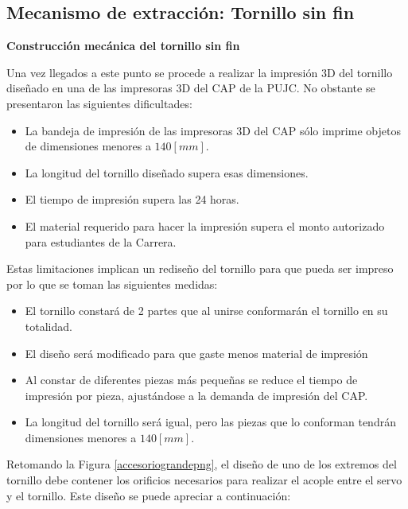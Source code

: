 \subsection{Mecanismo de extracción: Tornillo sin fin}
\item \textbf{Construcción mecánica del tornillo sin fin}

Una vez llegados a este punto se procede a realizar la impresión 3D del tornillo diseñado en una de las impresoras 3D del CAP de la PUJC. No obstante se presentaron las siguientes dificultades:
    
\begin{itemize}
    \item La bandeja de impresión de las impresoras 3D del CAP sólo imprime objetos de dimensiones menores a $140[mm]$.
    \item La longitud del tornillo diseñado supera esas dimensiones.
    \item El tiempo de impresión supera las 24 horas.
    \item El material requerido para hacer la impresión supera el monto autorizado para estudiantes de la Carrera.
\end{itemize}
    
Estas limitaciones implican un rediseño del tornillo para que pueda ser impreso por lo que se toman las siguientes medidas:

\begin{itemize}
    \item El tornillo constará de 2 partes que al unirse conformarán el tornillo en su totalidad.
    \item El diseño será modificado para que gaste menos material de impresión
    \item Al constar de diferentes piezas más pequeñas se reduce el tiempo de impresión por pieza, ajustándose a la demanda de impresión del CAP.
    \item La longitud del tornillo será igual, pero las piezas que lo conforman tendrán dimensiones menores a $140[mm]$.
\end{itemize}

Retomando la Figura \ref{accesoriograndepng}, el diseño de uno de los extremos del tornillo debe contener los orificios necesarios para realizar el acople entre el servo y el tornillo. Este diseño se puede apreciar a continuación:

